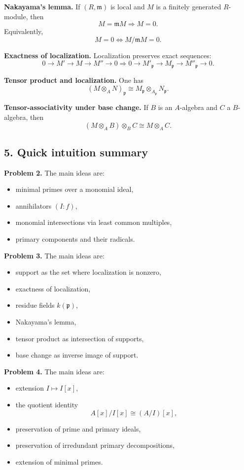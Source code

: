 \documentclass[12pt,a4paper]{article}
\theoremstyle{plain}
\theoremstyle{definition}      %
\begin{document}
	\textbf{Nakayama's lemma.}
	If \((R,\mathfrak m)\) is local and \(M\) is a finitely generated \(R\)-module, then
	\[
	M=\mathfrak m M \Longrightarrow M=0.
	\]
	Equivalently,
	\[
	M=0\iff M/\mathfrak m M=0.
	\]
	
	\medskip
	
	\textbf{Exactness of localization.}
	Localization preserves exact sequences:
	\[
	0\to M'\to M\to M''\to 0
	\Longrightarrow
	0\to M'_{\mathfrak p}\to M_{\mathfrak p}\to M''_{\mathfrak p}\to 0.
	\]
	
	\medskip
	
	\textbf{Tensor product and localization.}
	One has
	\[
	(M\otimes_A N)_{\mathfrak p}\cong M_{\mathfrak p}\otimes_{A_{\mathfrak p}}N_{\mathfrak p}.
	\]
	
	\medskip
	
	\textbf{Tensor-associativity under base change.}
	If \(B\) is an \(A\)-algebra and \(C\) a \(B\)-algebra, then
	\[
	(M\otimes_A B)\otimes_B C\cong M\otimes_A C.
	\]
	
	\subsection*{5. Quick intuition summary}
	
	\textbf{Problem 2.}
	The main ideas are:
	\begin{itemize}
		\item minimal primes over a monomial ideal,
		\item annihilators \((I:f)\),
		\item monomial intersections via least common multiples,
		\item primary components and their radicals.
	\end{itemize}
	
	\textbf{Problem 3.}
	The main ideas are:
	\begin{itemize}
		\item support as the set where localization is nonzero,
		\item exactness of localization,
		\item residue fields \(k(\mathfrak p)\),
		\item Nakayama's lemma,
		\item tensor product as intersection of supports,
		\item base change as inverse image of support.
	\end{itemize}
	
	\textbf{Problem 4.}
	The main ideas are:
	\begin{itemize}
		\item extension \(I\mapsto I[x]\),
		\item the quotient identity
		\[
		A[x]/I[x]\cong (A/I)[x],
		\]
		\item preservation of prime and primary ideals,
		\item preservation of irredundant primary decompositions,
		\item extension of minimal primes.
	\end{itemize}
	
\end{document}
